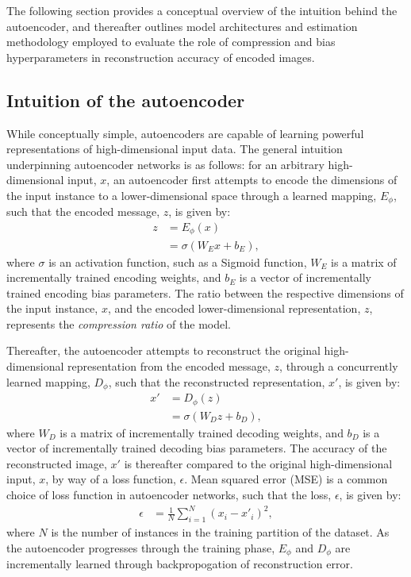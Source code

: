 
The following section provides a conceptual overview of the intuition behind the autoencoder, and thereafter outlines model architectures and estimation methodology employed to evaluate the role of compression and bias hyperparameters in reconstruction accuracy of encoded images. 

\subsection{Intuition of the autoencoder}\label{sec:intuition}
While conceptually simple, autoencoders are capable of learning powerful representations of high-dimensional input data. 
The general intuition underpinning autoencoder networks is as follows: for an arbitrary high-dimensional input, $x$, an autoencoder first attempts to encode the dimensions of the input instance to a lower-dimensional space through a learned mapping, $E_{\phi}$, such that the encoded message, $z$, is given by:
\begin{align}
	z 	&= E_{\phi}(x) \\
		&= \sigma(W_{E}x + b_{E}),
\end{align}
where $\sigma$ is an activation function, such as a Sigmoid function, $W_{E}$ is a matrix of incrementally trained encoding weights, and $b_{E}$ is a vector of incrementally trained encoding bias parameters.
The ratio between the respective dimensions of the input instance, $x$, and the encoded lower-dimensional representation, $z$, represents the \textit{compression ratio} of the model. 

Thereafter, the autoencoder attempts to reconstruct the original high-dimensional representation from the encoded message, $z$, through a concurrently learned mapping, $D_{\phi}$, such that the reconstructed representation, $x'$, is given by:
\begin{align}
	x' 	&= D_{\phi}(z)  \\
		&= \sigma(W_{D}z + b_{D}),
\end{align}
where $W_{D}$ is a matrix of incrementally trained decoding weights, and $b_{D}$ is a vector of incrementally trained decoding bias parameters.
The accuracy of the reconstructed image, $x'$ is thereafter compared to the original high-dimensional input, $x$, by way of a loss function, $\epsilon$. 
Mean squared error (MSE) is a common choice of loss function in autoencoder networks, such that the loss, $\epsilon$, is given by:
\begin{align}
	\epsilon 	&= \frac{1}{N}\sum^{N}_{i=1}(x_{i} - x'_{i})^2,
\end{align}
where $N$ is the number of instances in the training partition of the dataset. 
As the autoencoder progresses through the training phase, $E_{\phi}$ and $D_{\phi}$ are incrementally learned through backpropogation of reconstruction error.

